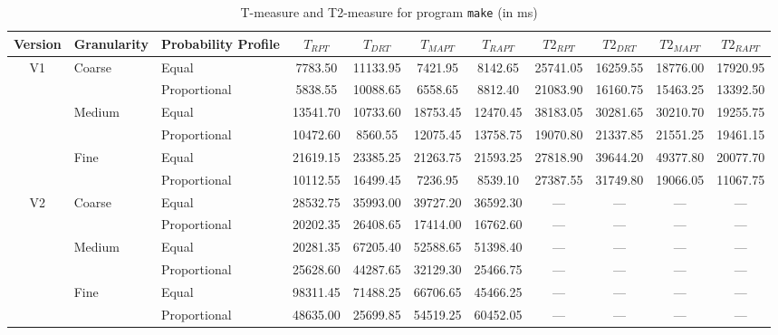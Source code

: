 \documentclass[10pt,journal,compsoc]{IEEEtran}
\begin{document}
\begin{table}
\caption{T-measure and T2-measure for program \texttt{make} (in ms)}
\label{tab:Tmake}
\centering
\begin{tabular}{|c|l|l|c|c|c|c|c|c|c|c|} \hline
Version	& Granularity	& Probability Profile	& $T_{RPT}$	& $T_{DRT}$	& $T_{MAPT}$	& $T_{RAPT}$	& $T2_{RPT}$	& $T2_{DRT}$	& $T2_{MAPT}$	 & $T2_{RAPT}$	\\ \hline
V1	& Coarse	& Equal	& 7783.50	& 11133.95	& 7421.95	& 8142.65	& 25741.05	& 16259.55	& 18776.00	& 17920.95	 \\ \cline{3-11}
	& 	& Proportional	& 5838.55	& 10088.65	& 6558.65	& 8812.40	& 21083.90	& 16160.75	& 15463.25	& 13392.50	 \\ \cline{2-11}
	& Medium	& Equal	& 13541.70	& 10733.60	& 18753.45	& 12470.45	& 38183.05	& 30281.65	& 30210.70	& 19255.75	 \\ \cline{3-11}
	& 	& Proportional	& 10472.60	& 8560.55	& 12075.45	& 13758.75	& 19070.80	& 21337.85	& 21551.25	& 19461.15	 \\ \cline{2-11}
	& Fine	& Equal	& 21619.15	& 23385.25	& 21263.75	& 21593.25	& 27818.90	& 39644.20	& 49377.80	& 20077.70	 \\ \cline{3-11}
	& 	& Proportional	& 10112.55	& 16499.45	& 7236.95	& 8539.10	& 27387.55	& 31749.80	& 19066.05	& 11067.75	 \\ \hline
V2	& Coarse	& Equal	& 28532.75	& 35993.00	& 39727.20	& 36592.30	& ---	& ---	& ---	& ---	 \\ \cline{3-11}
	& 	& Proportional	& 20202.35	& 26408.65	& 17414.00	& 16762.60	& ---	& ---	& ---	& ---	 \\ \cline{2-11}
	& Medium	& Equal	& 20281.35	& 67205.40	& 52588.65	& 51398.40	& ---	& ---	& ---	& ---	 \\ \cline{3-11}
	& 	& Proportional	& 25628.60	& 44287.65	& 32129.30	& 25466.75	& ---	& ---	& ---	& ---	 \\ \cline{2-11}
	& Fine	& Equal	& 98311.45	& 71488.25	& 66706.65	& 45466.25	& ---	& ---	& ---	& ---	 \\ \cline{3-11}
	& 	& Proportional	& 48635.00	& 25699.85	& 54519.25	& 60452.05	& ---	& ---	& ---	& ---	 \\ \hline
\end{tabular}
\end{table}
\end{document}
